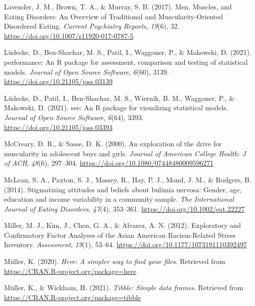 \documentclass[
  english,
  man, fleqn, noextraspace,floatsintext]{apa6}
\newlength{\cslhangindent}
\newlength{\cslentryspacingunit} %
\newenvironment{CSLReferences}[2] %
 {%
  \setlength{\parindent}{0pt}
  \ifodd #1
  \let\oldpar\par
  \def\par{\hangindent=\cslhangindent\oldpar}
  \fi
  \setlength{\parskip}{#2\cslentryspacingunit}
 }%
 {}
\begin{document}
\begin{CSLReferences}{1}{0}
\leavevmode{}%
Lavender, J. M., Brown, T. A., \& Murray, S. B. (2017). Men, {Muscles}, and {Eating} {Disorders}: An {Overview} of {Traditional} and {Muscularity}-{Oriented} {Disordered} {Eating}. \emph{Current Psychiatry Reports}, \emph{19}(6), 32. \url{https://doi.org/10.1007/s11920-017-0787-5}

\leavevmode{}%
Lüdecke, D., Ben-Shachar, M. S., Patil, I., Waggoner, P., \& Makowski, D. (2021). {performance}: An {R} package for assessment, comparison and testing of statistical models. \emph{Journal of Open Source Software}, \emph{6}(60), 3139. \url{https://doi.org/10.21105/joss.03139}

\leavevmode{}%
Lüdecke, D., Patil, I., Ben-Shachar, M. S., Wiernik, B. M., Waggoner, P., \& Makowski, D. (2021). {see}: An {R} package for visualizing statistical models. \emph{Journal of Open Source Software}, \emph{6}(64), 3393. \url{https://doi.org/10.21105/joss.03393}

\leavevmode{}%
McCreary, D. R., \& Sasse, D. K. (2000). An exploration of the drive for muscularity in adolescent boys and girls. \emph{Journal of American College Health: J of ACH}, \emph{48}(6), 297--304. \url{https://doi.org/10.1080/07448480009596271}

\leavevmode{}%
McLean, S. A., Paxton, S. J., Massey, R., Hay, P. J., Mond, J. M., \& Rodgers, B. (2014). Stigmatizing attitudes and beliefs about bulimia nervosa: Gender, age, education and income variability in a community sample. \emph{The International Journal of Eating Disorders}, \emph{47}(4), 353--361. \url{https://doi.org/10.1002/eat.22227}

\leavevmode{}%
Miller, M. J., Kim, J., Chen, G. A., \& Alvarez, A. N. (2012). Exploratory and {Confirmatory} {Factor} {Analyses} of the {Asian} {American} {Racism}-{Related} {Stress} {Inventory}. \emph{Assessment}, \emph{19}(1), 53--64. \url{https://doi.org/10.1177/1073191110392497}

\leavevmode{}%
Müller, K. (2020). \emph{Here: A simpler way to find your files}. Retrieved from \url{https://CRAN.R-project.org/package=here}

\leavevmode{}%
Müller, K., \& Wickham, H. (2021). \emph{Tibble: Simple data frames}. Retrieved from \url{https://CRAN.R-project.org/package=tibble}


\end{CSLReferences}
\end{document}
